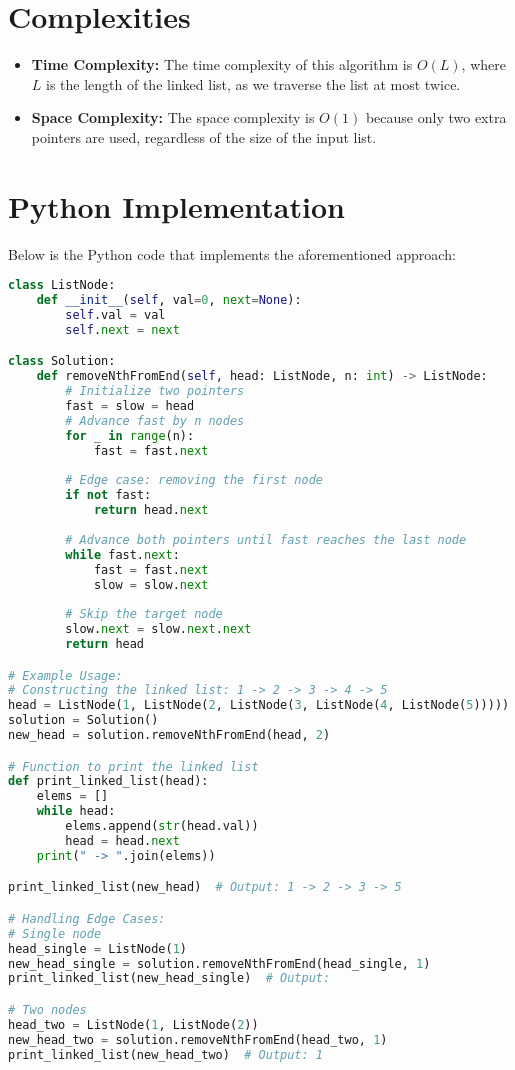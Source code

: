 \section*{Complexities}

\begin{itemize}
    \item \textbf{Time Complexity:} The time complexity of this algorithm is \(O(L)\), where \(L\) is the length of the linked list, as we traverse the list at most twice.
    \item \textbf{Space Complexity:} The space complexity is \(O(1)\) because only two extra pointers are used, regardless of the size of the input list.
\end{itemize}

\section*{Python Implementation}

Below is the Python code that implements the aforementioned approach:

\begin{fullwidth}
\begin{lstlisting}[language=Python]
class ListNode:
    def __init__(self, val=0, next=None):
        self.val = val
        self.next = next

class Solution:
    def removeNthFromEnd(self, head: ListNode, n: int) -> ListNode:
        # Initialize two pointers
        fast = slow = head 
        # Advance fast by n nodes
        for _ in range(n):
            fast = fast.next
        
        # Edge case: removing the first node
        if not fast:
            return head.next
        
        # Advance both pointers until fast reaches the last node
        while fast.next:
            fast = fast.next
            slow = slow.next
        
        # Skip the target node
        slow.next = slow.next.next
        return head

# Example Usage:
# Constructing the linked list: 1 -> 2 -> 3 -> 4 -> 5
head = ListNode(1, ListNode(2, ListNode(3, ListNode(4, ListNode(5)))))
solution = Solution()
new_head = solution.removeNthFromEnd(head, 2)

# Function to print the linked list
def print_linked_list(head):
    elems = []
    while head:
        elems.append(str(head.val))
        head = head.next
    print(" -> ".join(elems))

print_linked_list(new_head)  # Output: 1 -> 2 -> 3 -> 5

# Handling Edge Cases:
# Single node
head_single = ListNode(1)
new_head_single = solution.removeNthFromEnd(head_single, 1)
print_linked_list(new_head_single)  # Output: 

# Two nodes
head_two = ListNode(1, ListNode(2))
new_head_two = solution.removeNthFromEnd(head_two, 1)
print_linked_list(new_head_two)  # Output: 1
\end{lstlisting}
\end{fullwidth}

